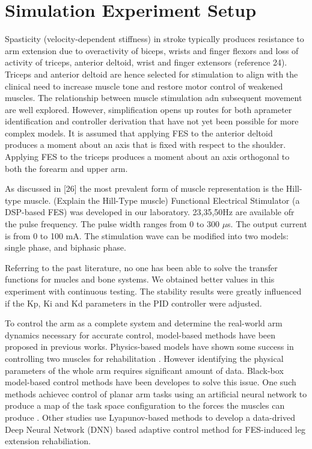 \section{Simulation Experiment Setup}
Spasticity (velocity-dependent stiffness) in stroke typically produces resistance to arm extension due to overactivity of biceps, wrists and finger flexors and loss of activity of triceps, anterior deltoid, wrist and finger extensors (reference 24). \cite{IOL}
Triceps and anterior deltoid are hence selected for stimulation to align with the clinical need to increase muscle tone and restore motor control of weakened muscles. 
The relationship between muscle stimulation adn subsequent movement are well explored. However, simplification opens up routes for both aprameter identification and controller derivation that have not yet been possible for more complex models. \cite{IOL}
It is assumed that applying FES to the anterior deltoid produces a moment about an axis that is fixed with respect to the shoulder. Applying FES to the triceps produces a moment about an axis orthogonal to both the forearm and upper arm.\cite{IOL}

As discussed in [26] the most prevalent form of muscle representation is the Hill-type muscle. (Explain the Hill-Type muscle)
Functional Electrical Stimulator (a DSP-based FES) was developed in our laboratory. 23,35,50Hz are available ofr the pulse frequency. 
The pulse width ranges from 0 to 300 $\mu$s. The output current is from 0 to 100 mA. The stimulation wave can be modified into two models: single phase, and biphasic phase. \cite{NNPID}



Referring to the past literature, no one has been able to solve the transfer functions for mucles and bone systems. We obtained better values in this experiment with continuous testing. The stability results were greatly influenced if the Kp, Ki and Kd parameters in the PID controller were adjusted. \cite{NNPID}

To control the arm as a complete system and determine the real-world arm dynamics necessary for accurate control, model-based methods have been proposed in previous works. Physics-based models have shown some success in controlling two muscles for rehabilitation \cite{IOL}. However identifying the physical parameters of the whole arm requires significant amount of data. Black-box model-based control methods have been developes to solve this issue. One such methods achievec control of planar arm tasks using an artificial neural network to produce a map of the task space configuration to the forces the muscles can produce \cite{FC2D}. Other studies use Lyapunov-based methods to develop a data-drived Deep Neural Network (DNN) based adaptive control method for FES-induced leg extension rehabiliation. \cite{CLDNN}

